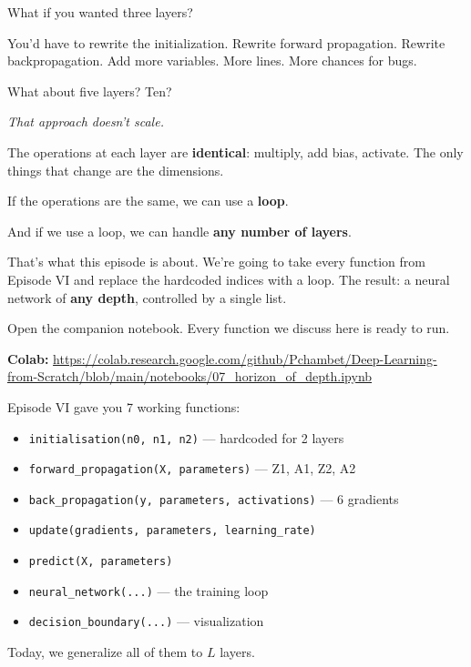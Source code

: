\documentclass[11pt]{article}
\begin{document}
What if you wanted three layers?

You'd have to rewrite the initialization. Rewrite forward propagation. Rewrite backpropagation. Add more variables. More lines. More chances for bugs.

What about five layers? Ten?

\textit{That approach doesn't scale.}

\begin{insightbox}[title=The Core Idea]
The operations at each layer are \textbf{identical}: multiply, add bias, activate. The only things that change are the dimensions.

If the operations are the same, we can use a \textbf{loop}.

And if we use a loop, we can handle \textbf{any number of layers}.
\end{insightbox}

That's what this episode is about. We're going to take every function from Episode VI and replace the hardcoded indices with a loop. The result: a neural network of \textbf{any depth}, controlled by a single list.

\begin{actionbox}[title=Let's Build]
Open the companion notebook. Every function we discuss here is ready to run.

\textbf{Colab:} \url{https://colab.research.google.com/github/Pchambet/Deep-Learning-from-Scratch/blob/main/notebooks/07_horizon_of_depth.ipynb}
\end{actionbox}

\begin{recapbox}[title=Where We Left Off]
Episode VI gave you 7 working functions:
\begin{itemize}
  \item \texttt{initialisation(n0, n1, n2)} --- hardcoded for 2 layers
  \item \texttt{forward\_propagation(X, parameters)} --- Z1, A1, Z2, A2
  \item \texttt{back\_propagation(y, parameters, activations)} --- 6 gradients
  \item \texttt{update(gradients, parameters, learning\_rate)}
  \item \texttt{predict(X, parameters)}
  \item \texttt{neural\_network(...)} --- the training loop
  \item \texttt{decision\_boundary(...)} --- visualization
\end{itemize}
Today, we generalize all of them to $L$ layers.
\end{recapbox}
\end{document}
